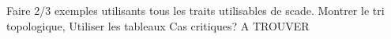 

Faire 2/3 exemples utilisants tous les traits utilisables de scade.
Montrer le tri topologique, 
Utiliser les tableaux
Cas critiques?
A TROUVER
